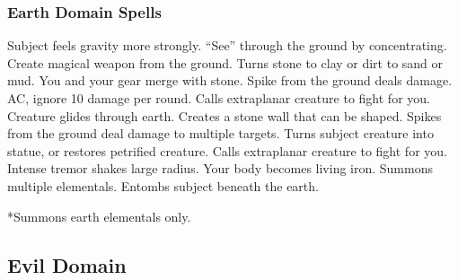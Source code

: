 \subsubsection{Earth Domain Spells}
\begin{spelllist}
   Subject feels gravity more strongly.
   ``See'' through the ground by concentrating.
   Create magical weapon from the ground.
   Turns stone to clay or dirt to sand or mud.
   You and your gear merge with stone.
   Spike from the ground deals damage. 
    AC, ignore 10 damage per round.
   Calls extraplanar creature to fight for you.
   Creature glides through earth. 
   Creates a stone wall that can be shaped.
   Spikes from the ground deal damage to multiple targets.
   Turns subject creature into statue, or restores petrified creature.
  \spellhead[7]{}
   Calls extraplanar creature to fight for you.
   Intense tremor shakes large radius.
   Your body becomes living iron.
   Summons multiple elementals.
   Entombs subject beneath the earth.
\end{spelllist}
*Summons earth elementals only.

\subsection{Evil Domain}

